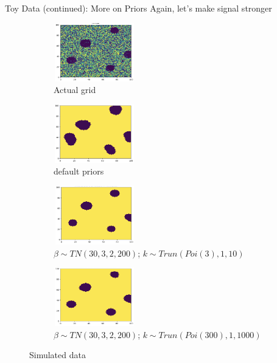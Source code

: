 \documentclass[10pt,mathserif]{beamer}
\begin{document}
\begin{frame}{Toy Data (continued): More on Priors}
Again, let's make signal stronger
\begin{figure}[t!]
    \centering
    \begin{subfigure}[t]{0.3\textwidth}
        \centering
        \includegraphics[height=1in, width=1.4in]{../BDC_gridactual}
        \caption{Actual grid}
    \end{subfigure}%
    \begin{subfigure}[t]{0.3\textwidth}
        \centering
        \includegraphics[height=1in, width=1.4in]{../BDC_grid1}
        \caption{default priors}
    \end{subfigure} %
    \begin{subfigure}[t]{0.3\textwidth}
        \centering
        \includegraphics[height=1in, width=1.4in]{../BDC_grid7_c3_ss}
        \caption{ $\beta \sim TN(30, 3, 2, 200)$; $k \sim Trun(Poi(3), 1, 10)$}
    \end{subfigure}%
        \begin{subfigure}[t]{0.3\textwidth}
        \centering
        \includegraphics[height=1in, width=1.4in]{../BDC_grid8_c300_ss}
        \caption{ $\beta \sim TN(30, 3, 2, 200)$; $k \sim Trun(Poi(300), 1, 1000)$}
    \end{subfigure}
    \caption{Simulated data}
\end{figure}
\end{frame}
\end{document}
